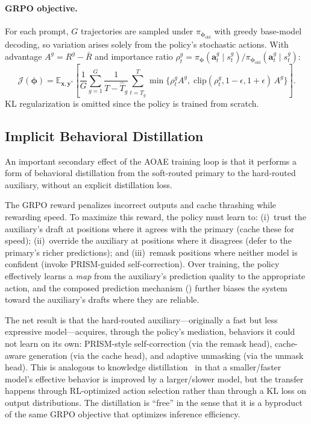 \documentclass[11pt]{article}
\newcommand{\E}{\mathbb{E}}
\newcommand{\cJ}{\mathcal{J}}
\newcommand{\bphi}{\bm{\phi}}
\newcommand{\bx}{\mathbf{x}}
\newcommand{\by}{\mathbf{y}}
\begin{document}
\paragraph{GRPO objective.}
For each prompt, $G$ trajectories are sampled under $\pi_{\bphi_{\text{old}}}$ with greedy base-model decoding, so variation arises solely from the policy's stochastic actions.
With advantage $A^g = R^g - \bar{R}$ and importance ratio $\rho_t^g = \pi_{\bphi}(\mathbf{a}_t^g \mid s_t^g) / \pi_{\bphi_{\text{old}}}(\mathbf{a}_t^g \mid s_t^g)$:
\begin{equation}
    \cJ(\bphi) = \E_{\bx, \by^*} \left[ \frac{1}{G} \sum_{g=1}^G \frac{1}{T - \hat{T}_g} \sum_{t=\hat{T}_g}^{T} \min\!\Big\{ \rho_t^g A^g,\; \text{clip}(\rho_t^g, 1{-}\epsilon, 1{+}\epsilon)\, A^g \Big\} \right].
    \label{eq:grpo}
\end{equation}
KL regularization is omitted since the policy is trained from scratch.

\subsection{Implicit Behavioral Distillation}
\label{sec:distillation}

An important secondary effect of the AOAE training loop is that it performs a form of behavioral distillation from the soft-routed primary to the hard-routed auxiliary, without an explicit distillation loss.

The GRPO reward penalizes incorrect outputs and cache thrashing while rewarding speed.
To maximize this reward, the policy must learn to: (i)~trust the auxiliary's draft at positions where it agrees with the primary (cache these for speed); (ii)~override the auxiliary at positions where it disagrees (defer to the primary's richer predictions); and (iii)~remask positions where neither model is confident (invoke PRISM-guided self-correction).
Over training, the policy effectively learns a \emph{map} from the auxiliary's prediction quality to the appropriate action, and the composed prediction mechanism () further biases the system toward the auxiliary's drafts where they are reliable.

The net result is that the hard-routed auxiliary---originally a fast but less expressive model---acquires, through the policy's mediation, behaviors it could not learn on its own: PRISM-style self-correction (via the remask head), cache-aware generation (via the cache head), and adaptive unmasking (via the unmask head).
This is analogous to knowledge distillation~\cite{hinton2015distilling} in that a smaller/faster model's effective behavior is improved by a larger/slower model, but the transfer happens through RL-optimized action selection rather than through a KL loss on output distributions.
The distillation is ``free'' in the sense that it is a byproduct of the same GRPO objective that optimizes inference efficiency.
\end{document}
